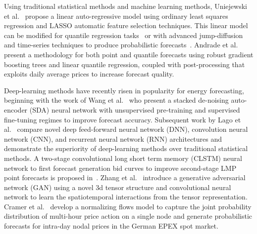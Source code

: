Using traditional statistical methods and machine learning methods, Uniejewski et al.~\cite{en9080621} propose a linear
auto-regressive model using ordinary least squares regression and LASSO automatic feature selection techniques.
This linear model can be modified for quantile regression tasks~\cite{UNIEJEWSKI2021105121} or with advanced
jump-diffusion and time-series techniques to produce probabilistic forecasts~\cite{MUNIAIN20201193}.
Andrade et al.~\cite{00000} present a methodology for both point and quantile forecasts using robust gradient boosting
trees and linear quantile regression, coupled with post-processing that exploits daily average prices to increase
forecast quality.

Deep-learning methods have recently risen in popularity for energy forecasting, beginning with the work of
Wang et al.~\cite{7744689} who present a stacked de-noising auto-encoder (SDA) neural network with unsupervised
pre-training and supervised fine-tuning regimes to improve forecast accuracy.
Subsequent work by Lago et al.~\cite{LAGO2018386} compare novel deep feed-forward neural network (DNN),
convolution neural network (CNN), and recurrent neural network (RNN) architectures and demonstrate the superiority of
deep-learning methods over traditional statistical methods.
A two-stage convolutional long short term memory (CLSTM) neural network to first
forecast generation bid curves to improve second-stage LMP point forecasts is proposed in~\cite{9916722}.
Zhang et al.~\cite{9520248} introduce a generative adversarial network (GAN) using a novel 3d tensor structure and
convolutional neural network to learn the spatiotemporal interactions from the tensor representation.
Cramer et al.~\cite{48550} develop a normalizing flows model to capture the joint probability distribution of multi-hour
price action on a single node and generate probabilistic forecasts for intra-day nodal prices in the German EPEX spot
market.
